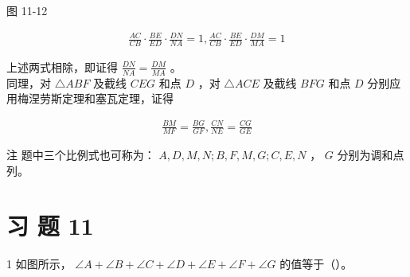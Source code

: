 \documentclass[10pt]{article}
\begin{document}
图 11-12

\begin{align*}
\frac{A C}{C B} \cdot \frac{B E}{E D} \cdot \frac{D N}{N A}=1, \frac{A C}{C B} \cdot \frac{B E}{E D} \cdot \frac{D M}{M A}=1
\end{align*}

上述两式相除，即证得 $\frac{D N}{N A}=\frac{D M}{M A}$ 。\\
同理，对 $\triangle A B F$ 及截线 $C E G$ 和点 $D$ ，对 $\triangle A C E$ 及截线 $B F G$ 和点 $D$ 分别应用梅涅劳斯定理和塞瓦定理，证得

\begin{align*}
\frac{B M}{M F}=\frac{B G}{G F}, \frac{C N}{N E}=\frac{C G}{G E}
\end{align*}

注 题中三个比例式也可称为： $A, D, M, N ; B, F, M, G ; C, E, N$ ， $G$ 分别为调和点列。

\section*{习 题 11}
1 如图所示， $\angle A+\angle B+\angle C+\angle D+\angle E+\angle F+\angle G$ 的值等于（）。
\end{document}
